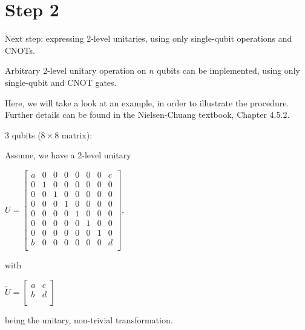 \section{Step 2}
{Next step: expressing 2-level unitaries, using only single-qubit operations and CNOTs. \\
\begin{claim}
    Arbitrary 2-level unitary operation on $n$ qubits can be implemented, using only single-qubit and CNOT gates.
\end{claim} 
Here, we will take a look at an example, in order to illustrate the procedure. Further details can be found in the Nielsen-Chuang textbook, Chapter 4.5.2. \\
\begin{example}
    3 qubits ($8 \times 8$ matrix):
\end{example}
Assume, we have a 2-level unitary 
\begin{center}
   $U = 
\begin{bmatrix}
 a & 0 & 0 & 0 & 0 & 0 & 0 & c \\
 0 & 1 & 0 & 0 & 0 & 0 & 0 & 0 \\    
 0 & 0 & 1 & 0 & 0 & 0 & 0 & 0 \\
 0 & 0 & 0 & 1 & 0 & 0 & 0 & 0 \\
 0 & 0 & 0 & 0 & 1 & 0 & 0 & 0 \\
 0 & 0 & 0 & 0 & 0 & 1 & 0 & 0 \\
 0 & 0 & 0 & 0 & 0 & 0 & 1 & 0 \\
 b & 0 & 0 & 0 & 0 & 0 & 0 & d \\
\end{bmatrix}$,  
\end{center}
with 
\begin{center}
    $\tilde{U} = 
\begin{bmatrix}
 a  &  c  \\
 b  &  d  \\
\end{bmatrix}$
\end{center}
being the unitary, non-trivial transformation. \\

}
